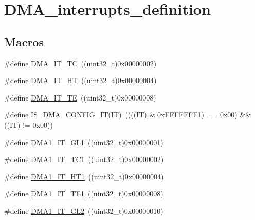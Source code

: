 \hypertarget{group___d_m_a__interrupts__definition}{}\section{D\+M\+A\+\_\+interrupts\+\_\+definition}
\label{group___d_m_a__interrupts__definition}
\subsection*{Macros}
\begin{DoxyCompactItemize}
\item 
\#define \mbox{\hyperlink{group___d_m_a__interrupts__definition_ga06e83dd277e0d3e5635cf8ce8dfd6e16}{D\+M\+A\+\_\+\+I\+T\+\_\+\+TC}}~((uint32\+\_\+t)0x00000002)
\item 
\#define \mbox{\hyperlink{group___d_m_a__interrupts__definition_gadf11c572b9797e04a14b105fdc2e5f66}{D\+M\+A\+\_\+\+I\+T\+\_\+\+HT}}~((uint32\+\_\+t)0x00000004)
\item 
\#define \mbox{\hyperlink{group___d_m_a__interrupts__definition_gaf9d92649d2a0146f663ff253d8f3b59e}{D\+M\+A\+\_\+\+I\+T\+\_\+\+TE}}~((uint32\+\_\+t)0x00000008)
\item 
\#define \mbox{\hyperlink{group___d_m_a__interrupts__definition_ga47f6af7da302c19aba24516037d305e7}{I\+S\+\_\+\+D\+M\+A\+\_\+\+C\+O\+N\+F\+I\+G\+\_\+\+IT}}(IT)~((((IT) \& 0x\+F\+F\+F\+F\+F\+F\+F1) == 0x00) \&\& ((\+I\+T) != 0x00))
\item 
\#define \mbox{\hyperlink{group___d_m_a__interrupts__definition_ga017d35f4f6fbf5689ef39af7227bc5b0}{D\+M\+A1\+\_\+\+I\+T\+\_\+\+G\+L1}}~((uint32\+\_\+t)0x00000001)
\item 
\#define \mbox{\hyperlink{group___d_m_a__interrupts__definition_ga783532083dcc6e9752feb2e982ce7426}{D\+M\+A1\+\_\+\+I\+T\+\_\+\+T\+C1}}~((uint32\+\_\+t)0x00000002)
\item 
\#define \mbox{\hyperlink{group___d_m_a__interrupts__definition_gaea8c98e79c8cb420c81f7380a4c8e1da}{D\+M\+A1\+\_\+\+I\+T\+\_\+\+H\+T1}}~((uint32\+\_\+t)0x00000004)
\item 
\#define \mbox{\hyperlink{group___d_m_a__interrupts__definition_ga0121b479efafe485719d14634a02d542}{D\+M\+A1\+\_\+\+I\+T\+\_\+\+T\+E1}}~((uint32\+\_\+t)0x00000008)
\item 
\#define \mbox{\hyperlink{group___d_m_a__interrupts__definition_ga183f3044b39da5e3b3c688239086f836}{D\+M\+A1\+\_\+\+I\+T\+\_\+\+G\+L2}}~((uint32\+\_\+t)0x00000010)
\item 

\end{DoxyCompactItemize}
